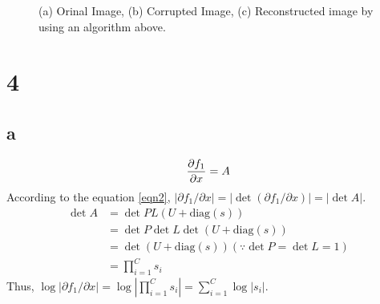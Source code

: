 \documentclass[10pt]{article}
\begin{document}
\begin{figure}[!h]
\begin{center}
{        }
    \end{center}
    \caption{(a) Orinal Image, (b) Corrupted Image, (c) Reconstructed image by using an algorithm above.}
    \label{fig2}
\end{figure}

\section*{4}
\subsection*{a}
\begin{equation}
    {\partial f_1 \over \partial x} = A
    \label{eqn2}
\end{equation}
According to the equation \ref{eqn2}, $\left|{\partial f_1 / \partial x} \right| = \left| \det{({\partial f_1 / \partial x})} \right| = \left| \det A\right|$.
\begin{align*}
    \det A &= \det PL(U + \text{diag}(s)) \\
    &= \det P \det L \det(U + \text{diag}(s)) \\
    &= \det(U + \text{diag}(s)) (\because \det P = \det L = 1) \\
    &= \prod_{i=1}^C s_i
\end{align*}
Thus, $\log \left|{\partial f_1 / \partial x} \right| = \log \left|\prod_{i=1}^C s_i\right| = \sum_{i=1}^C \log |s_i|$.
\end{document}
